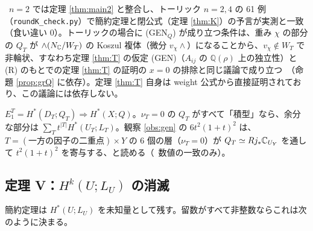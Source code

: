 \tV\ $n=2$ では定理 \ref{thm:main2} と整合し、トーリック $n=2,4$ の 61 例（\texttt{roundK\_check.py}）で簡約定理と閉公式（定理 \ref{thm:K}）の予言が実測と一致（食い違い 0）。トーリックの場合に (GEN$_Q$) が成り立つ条件は、重み $\chi$ の部分の $Q_T$ が $\wedge(N_\mathbb C/W_T)$ の Koszul 複体（微分 $v_\chi\wedge$）になることから、$v_\chi\notin W_T$ で非輪状、すなわち定理 \ref{thm:T} の仮定 (GEN)（$A_{ij}$ の $\mathbb Q(\rho)$ 上の独立性）と (R) のもとでの定理 \ref{thm:T} の証明の $x=0$ の排除と同じ議論で成り立つ\tP\ \tQ（命題 \ref{prop:grQ} に依存）。定理 \ref{thm:T} 自身は weight 公式から直接証明されており、この議論には依存しない。

\begin{conj}\tK\label{conj:nonacyc}
$E_1^T=H^*(D_T;Q_T)\Rightarrow H^*(X;Q)$。$\nu_T=0$ の $Q_T$ がすべて「積型」なら、余分な部分は $\sum_Tt^{|T|}H^*(U_T;L_T)$。観察 \ref{obs:gen} の $6t^2(1+t)^2$ は、$T=(\text{一方の因子の二重点})\times Y$ の 6 個の層（$\nu_T=0$）が $Q_T\simeq Rj_*\mathbb C_{U_Y}$ を通して $t^2(1+t)^2$ を寄与する、と読める（\tV\ 数値の一致のみ）。
\end{conj}

\subsection{定理 V：$H^k(U;L_U)$ の消滅}
簡約定理は $H^*(U;L_U)$ を未知量として残す。留数がすべて非整数ならこれは次のように決まる。

